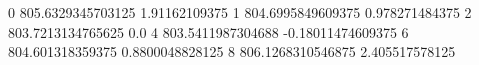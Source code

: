 0 805.6329345703125 1.91162109375
1 804.6995849609375 0.978271484375
2 803.7213134765625 0.0
4 803.5411987304688 -0.18011474609375
6 804.601318359375 0.8800048828125
8 806.1268310546875 2.405517578125
